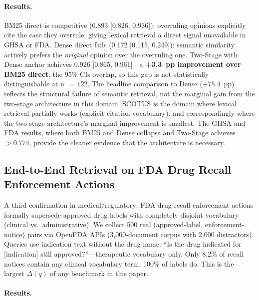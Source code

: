 \documentclass[11pt]{article}
\begin{document}
\paragraph{Results.} BM25 direct is competitive (0.893 [0.826, 0.936]): overruling opinions explicitly cite the case they overrule, giving lexical retrieval a direct signal unavailable in GHSA or FDA. Dense direct fails (0.172 [0.115, 0.249]): semantic similarity actively prefers the \emph{original} opinion over the overruling one. Two-Stage with Dense anchor achieves 0.926 [0.865, 0.961]---a \textbf{+3.3~pp improvement over BM25 direct}; the 95\% CIs overlap, so this gap is not statistically distinguishable at n~$=122$. The headline comparison to Dense ($+75.4$~pp) reflects the structural failure of semantic retrieval, not the marginal gain from the two-stage architecture in this domain. SCOTUS is the domain where lexical retrieval partially works (explicit citation vocabulary), and correspondingly where the two-stage architecture's marginal improvement is smallest. The GHSA and FDA results, where both BM25 and Dense collapse and Two-Stage achieves $>0.774$, provide the cleaner evidence that the architecture is necessary.

\subsection{End-to-End Retrieval on FDA Drug Recall Enforcement Actions}
\label{sec:fda_realworld}

A third confirmation in medical/regulatory: FDA drug recall enforcement actions formally supersede approved drug labels with completely disjoint vocabulary (clinical vs.\ administrative). We collect 500 real (approved-label, enforcement-notice) pairs via OpenFDA APIs (3,000-document corpus with 2,000 distractors). Queries use indication text without the drug name: ``Is the drug indicated for [indication] still approved?''---therapeutic vocabulary only. Only 8.2\% of recall notices contain any clinical vocabulary term; 100\% of labels do. This is the largest $\Delta(q)$ of any benchmark in this paper.

\paragraph{Results.}
\end{document}
